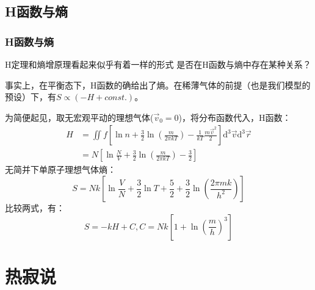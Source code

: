 \documentclass{if-beamer}
\begin{document}
\subsection{H函数与熵}
\begin{frame}
    \frametitle{H函数与熵}
        H定理和熵增原理看起来似乎有着一样的形式
        是否在H函数与熵中存在某种关系？
        
        
    \begin{block}{}
        事实上，在平衡态下，H函数的确给出了熵。在稀薄气体的前提（也是我们模型的预设）下，有$S\propto(-H+const.)$。 
                                                                                                                                                                                                                                                                                 
    \end{block}
    \begin{block}{}
        为简便起见，取无宏观平动的理想气体($\vec{v}_0=0$)，将分布函数代入，H函数：
        \begin{equation*}
            \begin{aligned}
                H&=\iint f\left[\ln n+\frac{3}{2} \ln \left(\frac{m}{2 \pi k T}\right)-\frac{1}{k T} \frac{m \vec{v}^{2}}{2}\right] \mathrm{d}^{3} \vec{v} \mathrm{d}^{3} \vec{r}\\
                &=N\left[\ln \frac{N}{V}+\frac{3}{2} \ln \left(\frac{m}{2 \pi k T}\right)-\frac{3}{2}\right]
            \end{aligned}
        \end{equation*}
        无简并下单原子理想气体熵：
        \begin{equation*}
            S=N k\left[\ln \frac{V}{N}+\frac{3}{2} \ln T+\frac{5}{2}+\frac{3}{2} \ln \left(\frac{2 \pi m k}{h^{2}}\right)\right]
        \end{equation*}
        比较两式，有：
        \begin{equation*}
            S=-k H+C,C=N k\left[1+\ln \left(\frac{m}{h}\right)^{3}\right]
        \end{equation*}

            
        

    \end{block}


        
    

\end{frame}
\section{热寂说}
\end{document}
